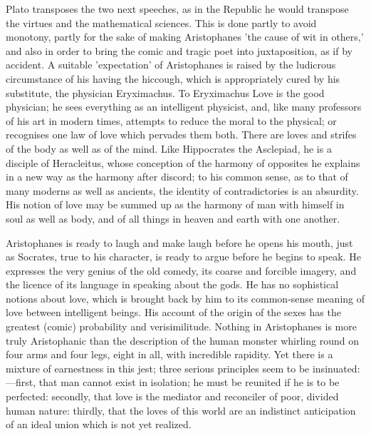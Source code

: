 \documentclass[11pt,letter]{article}
\begin{document}
\par  Plato transposes the two next speeches, as in the Republic he would transpose the virtues and the mathematical sciences. This is done partly to avoid monotony, partly for the sake of making Aristophanes 'the cause of wit in others,' and also in order to bring the comic and tragic poet into juxtaposition, as if by accident. A suitable 'expectation' of Aristophanes is raised by the ludicrous circumstance of his having the hiccough, which is appropriately cured by his substitute, the physician Eryximachus. To Eryximachus Love is the good physician; he sees everything as an intelligent physicist, and, like many professors of his art in modern times, attempts to reduce the moral to the physical; or recognises one law of love which pervades them both. There are loves and strifes of the body as well as of the mind. Like Hippocrates the Asclepiad, he is a disciple of Heracleitus, whose conception of the harmony of opposites he explains in a new way as the harmony after discord; to his common sense, as to that of many moderns as well as ancients, the identity of contradictories is an absurdity. His notion of love may be summed up as the harmony of man with himself in soul as well as body, and of all things in heaven and earth with one another.

\par  Aristophanes is ready to laugh and make laugh before he opens his mouth, just as Socrates, true to his character, is ready to argue before he begins to speak. He expresses the very genius of the old comedy, its coarse and forcible imagery, and the licence of its language in speaking about the gods. He has no sophistical notions about love, which is brought back by him to its common-sense meaning of love between intelligent beings. His account of the origin of the sexes has the greatest (comic) probability and verisimilitude. Nothing in Aristophanes is more truly Aristophanic than the description of the human monster whirling round on four arms and four legs, eight in all, with incredible rapidity. Yet there is a mixture of earnestness in this jest; three serious principles seem to be insinuated:—first, that man cannot exist in isolation; he must be reunited if he is to be perfected: secondly, that love is the mediator and reconciler of poor, divided human nature: thirdly, that the loves of this world are an indistinct anticipation of an ideal union which is not yet realized.
\end{document}
